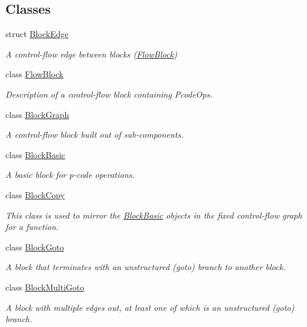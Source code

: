 \subsection*{Classes}
\begin{DoxyCompactItemize}
\item 
struct \mbox{\hyperlink{struct_block_edge}{Block\+Edge}}
\begin{DoxyCompactList}\small\item\em A control-\/flow edge between blocks (\mbox{\hyperlink{class_flow_block}{Flow\+Block}}) \end{DoxyCompactList}\item 
class \mbox{\hyperlink{class_flow_block}{Flow\+Block}}
\begin{DoxyCompactList}\small\item\em Description of a control-\/flow block containing Pcode\+Ops. \end{DoxyCompactList}\item 
class \mbox{\hyperlink{class_block_graph}{Block\+Graph}}
\begin{DoxyCompactList}\small\item\em A control-\/flow block built out of sub-\/components. \end{DoxyCompactList}\item 
class \mbox{\hyperlink{class_block_basic}{Block\+Basic}}
\begin{DoxyCompactList}\small\item\em A basic block for p-\/code operations. \end{DoxyCompactList}\item 
class \mbox{\hyperlink{class_block_copy}{Block\+Copy}}
\begin{DoxyCompactList}\small\item\em This class is used to mirror the \mbox{\hyperlink{class_block_basic}{Block\+Basic}} objects in the fixed control-\/flow graph for a function. \end{DoxyCompactList}\item 
class \mbox{\hyperlink{class_block_goto}{Block\+Goto}}
\begin{DoxyCompactList}\small\item\em A block that terminates with an unstructured (goto) branch to another block. \end{DoxyCompactList}\item 
class \mbox{\hyperlink{class_block_multi_goto}{Block\+Multi\+Goto}}
\begin{DoxyCompactList}\small\item\em A block with multiple edges out, at least one of which is an unstructured (goto) branch. \end{DoxyCompactList}\item 

\end{DoxyCompactItemize}
